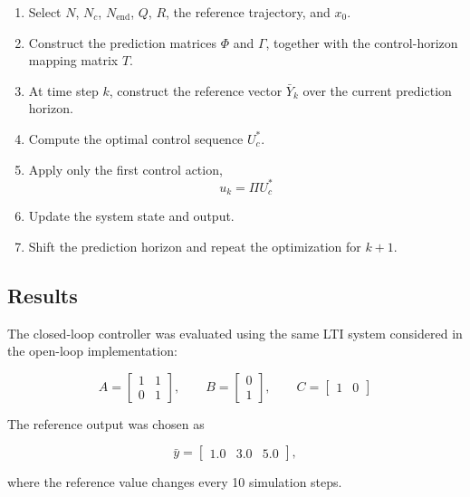 \begin{enumerate}
    \item Select \(N\), \(N_c\), \(N_{\mathrm{end}}\), \(Q\), \(R\), the reference trajectory, and \(x_0\).
    \item Construct the prediction matrices \(\Phi\) and \(\Gamma\), together with the control-horizon mapping matrix \(T\).
    \item At time step \(k\), construct the reference vector \(\bar{Y}_k\) over the current prediction horizon.
    \item Compute the optimal control sequence \(U_c^\ast\).
    \item Apply only the first control action,
    \[
        u_k = \Pi U_c^\ast
    \]
    \item Update the system state and output.
    \item Shift the prediction horizon and repeat the optimization for \(k+1\).
\end{enumerate}

\newpage
\subsection{Results}
\label{subsec:closed_loop_results}

The closed-loop controller was evaluated using the same LTI system considered in the open-loop implementation:

\begin{equation}
    A =
    \begin{bmatrix}
        1 & 1 \\
        0 & 1
    \end{bmatrix},
    \qquad
    B =
    \begin{bmatrix}
        0 \\
        1
    \end{bmatrix},
    \qquad
    C =
    \begin{bmatrix}
        1 & 0
    \end{bmatrix}
\end{equation}

The reference output was chosen as

\begin{equation}
    \bar{y}
    =
    \begin{bmatrix}
        1.0 & 3.0 & 5.0
    \end{bmatrix},
\end{equation}

where the reference value changes every 10 simulation steps.

